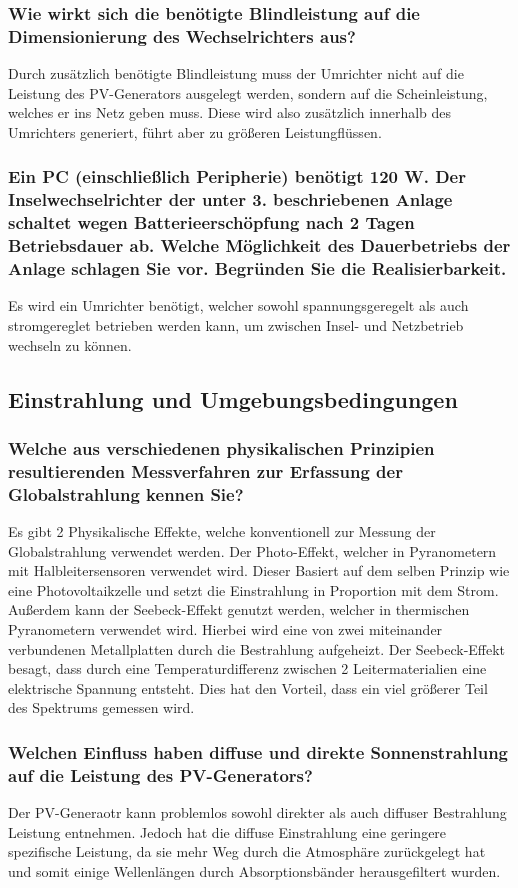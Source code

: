 \subsubsection{Wie wirkt sich die benötigte Blindleistung auf die Dimensionierung des Wechselrichters aus?}
Durch zusätzlich benötigte Blindleistung muss der Umrichter nicht auf die Leistung des PV-Generators ausgelegt werden, sondern auf die Scheinleistung, welches er ins Netz geben muss.
Diese wird also zusätzlich innerhalb des Umrichters generiert, führt aber zu größeren Leistungflüssen.\cite{SMA_Q-Auslegung}
\subsubsection{Ein PC (einschließlich Peripherie) benötigt 120 W. Der Inselwechselrichter der unter 3. beschriebenen Anlage schaltet wegen Batterieerschöpfung nach 2 Tagen Betriebsdauer ab. Welche Möglichkeit des Dauerbetriebs der Anlage schlagen Sie vor. Begründen Sie die Realisierbarkeit.}
Es wird ein Umrichter benötigt, welcher sowohl spannungsgeregelt als auch stromgereglet betrieben werden kann, um zwischen Insel- und Netzbetrieb wechseln zu können.
\subsection{Einstrahlung und Umgebungsbedingungen}
\subsubsection{Welche aus verschiedenen physikalischen Prinzipien resultierenden Messverfahren zur Erfassung der Globalstrahlung kennen Sie?}
Es gibt 2 Physikalische Effekte, welche konventionell zur Messung der Globalstrahlung verwendet werden. 
Der Photo-Effekt, welcher in Pyranometern mit Halbleitersensoren verwendet wird. 
Dieser Basiert auf dem selben Prinzip wie eine Photovoltaikzelle und setzt die Einstrahlung in Proportion mit dem Strom.
Außerdem kann der Seebeck-Effekt genutzt werden, welcher in thermischen Pyranometern verwendet wird.
Hierbei wird eine von zwei miteinander verbundenen Metallplatten durch die Bestrahlung aufgeheizt. 
Der Seebeck-Effekt besagt, dass durch eine Temperaturdifferenz zwischen 2 Leitermaterialien eine elektrische Spannung entsteht.\cite{Wiki-Seebeck}
Dies hat den Vorteil, dass ein viel größerer Teil des Spektrums gemessen wird.

\subsubsection{Welchen Einfluss haben diffuse und direkte Sonnenstrahlung auf die Leistung des PV-Generators?}
Der PV-Generaotr kann problemlos sowohl direkter als auch diffuser Bestrahlung Leistung entnehmen. 
Jedoch hat die diffuse Einstrahlung eine geringere spezifische Leistung, da sie mehr Weg durch die Atmosphäre zurückgelegt hat und somit einige Wellenlängen durch Absorptionsbänder herausgefiltert wurden.
